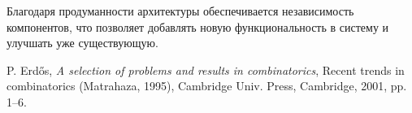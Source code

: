 \documentclass[a4paper]{report}
\begin{document}
Благодаря продуманности архитектуры обеспечивается независимость компонентов, что позволяет добавлять новую функциональность в систему и улучшать уже существующую.

\newpage

\begin{thebibliography}{9}
 P. Erd\H os, \emph{A selection of problems and
results in combinatorics}, Recent trends in combinatorics (Matrahaza,
1995), Cambridge Univ. Press, Cambridge, 2001, pp. 1--6.
\end{thebibliography}
\end{document}
